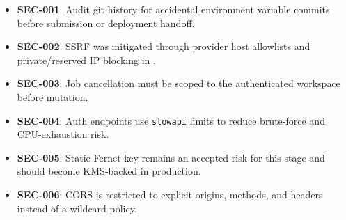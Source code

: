 \documentclass[12pt,a4paper]{report}
\begin{document}
\begin{itemize}
  \item \textbf{SEC-001}: Audit git history for accidental environment variable commits before submission or deployment handoff.
  \item \textbf{SEC-002}: SSRF was mitigated through provider host allowlists and private/reserved IP blocking in .
  \item \textbf{SEC-003}: Job cancellation must be scoped to the authenticated workspace before mutation.
  \item \textbf{SEC-004}: Auth endpoints use \texttt{slowapi} limits to reduce brute-force and CPU-exhaustion risk.
  \item \textbf{SEC-005}: Static Fernet key remains an accepted risk for this stage and should become KMS-backed in production.
  \item \textbf{SEC-006}: CORS is restricted to explicit origins, methods, and headers instead of a wildcard policy.
\end{itemize}
\end{document}
